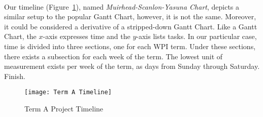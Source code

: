 \paragraph{}
Our timeline (Figure~\ref{fig:project_timeline}), named \textit{Muirhead-Scanlon-Yasuna Chart}, depicts a similar setup to the popular Gantt Chart, however, it is not the same. Moreover, it could be considered a derivative of a stripped-down Gantt Chart. Like a Gantt Chart, the $x$-axis expresses time and the $y$-axis lists tasks. In our particular case, time is divided into three sections, one for each WPI term. Under these sections, there exists a subsection for each week of the term. The lowest unit of measurement exists per week of the term, as days from Sunday through Saturday. \TODO Finish.



\begin{figure}[H]
    \centering
    \texttt{[image: Term A Timeline]}
    \caption{Term A Project Timeline}
    \label{fig:project_timeline}
\end{figure}
